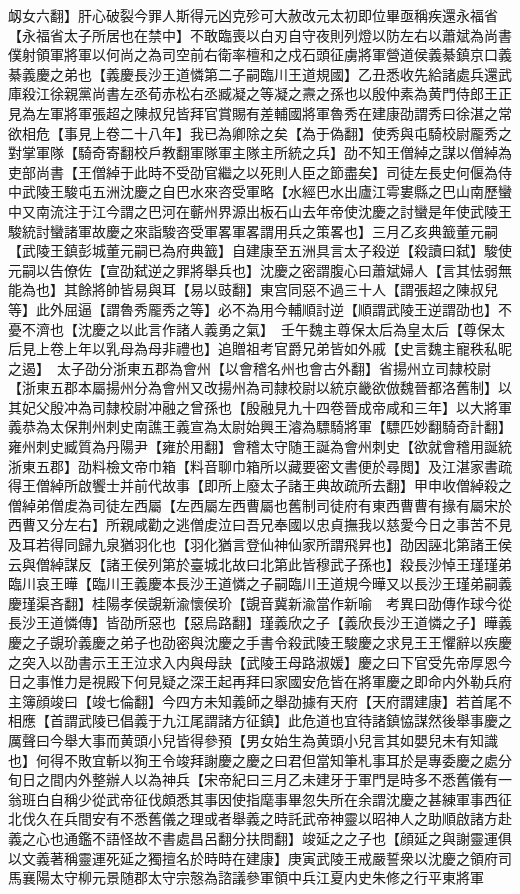 衂女六翻】肝心破裂今罪人斯得元凶克殄可大赦改元太初即位畢亟稱疾還永福省【永福省太子所居也在禁中】不敢臨喪以白刃自守夜則列燈以防左右以蕭斌為尚書僕射領軍將軍以何尚之為司空前右衛率檀和之戍石頭征虜將軍營道侯義綦鎮京口義綦義慶之弟也【義慶長沙王道憐第二子嗣臨川王道規國】乙丑悉收先給諸處兵還武庫殺江徐親黨尚書左丞荀赤松右丞臧凝之等凝之燾之孫也以殷仲素為黄門侍郎王正見為左軍將軍張超之陳叔兒皆拜官賞賜有差輔國將軍魯秀在建康劭謂秀曰徐湛之常欲相危【事見上卷二十八年】我已為卿除之矣【為于偽翻】使秀與屯騎校尉龎秀之對掌軍隊【騎奇寄翻校戶教翻軍隊軍主隊主所統之兵】劭不知王僧綽之謀以僧綽為吏部尚書【王僧綽于此時不受劭官繼之以死則人臣之節盡矣】司徒左長史何偃為侍中武陵王駿屯五洲沈慶之自巴水來咨受軍略【水經巴水出廬江雩婁縣之巴山南歷蠻中又南流注于江今謂之巴河在蘄州界源出板石山去年帝使沈慶之討蠻是年使武陵王駿統討蠻諸軍故慶之來詣駿咨受軍畧軍畧謂用兵之策畧也】三月乙亥典籖董元嗣【武陵王鎮彭城董元嗣已為府典籖】自建康至五洲具言太子殺逆【殺讀曰弑】駿使元嗣以告僚佐【宣劭弑逆之罪將舉兵也】沈慶之密謂腹心曰蕭斌婦人【言其怯弱無能為也】其餘將帥皆易與耳【易以豉翻】東宫同惡不過三十人【謂張超之陳叔兒等】此外屈逼【謂魯秀龎秀之等】必不為用今輔順討逆【順謂武陵王逆謂劭也】不憂不濟也【沈慶之以此言作諸人義勇之氣】　壬午魏主尊保太后為皇太后【尊保太后見上卷上年以乳母為母非禮也】追贈祖考官爵兄弟皆如外戚【史言魏主寵秩私昵之遏】　太子劭分浙東五郡為會州【以會稽名州也會古外翻】省揚州立司隸校尉【浙東五郡本屬揚州分為會州又改揚州為司隸校尉以統京畿欲倣魏晉都洛舊制】以其妃父殷冲為司隸校尉冲融之曾孫也【殷融見九十四卷晉成帝咸和三年】以大將軍義恭為太保荆州刺史南譙王義宣為太尉始興王濬為驃騎將軍【驃匹妙翻騎奇計翻】雍州刺史臧質為丹陽尹【雍於用翻】會稽太守随王誕為會州刺史【欲就會稽用誕統浙東五郡】劭料檢文帝巾箱【料音聊巾箱所以藏要密文書便於尋閲】及江湛家書疏得王僧綽所啟饗士并前代故事【即所上廢太子諸王典故疏所去翻】甲申收僧綽殺之僧綽弟僧䖍為司徒左西屬【左西屬左西曹屬也舊制司徒府有東西曹曹有掾有屬宋於西曹又分左右】所親咸勸之逃僧䖍泣曰吾兄奉國以忠貞撫我以慈愛今日之事苦不見及耳若得同歸九泉猶羽化也【羽化猶言登仙神仙家所謂飛昇也】劭因誣北第諸王侯云與僧綽謀反【諸王侯列第於臺城北故曰北第此皆穆武子孫也】殺長沙悼王瑾瑾弟臨川哀王曄【臨川王義慶本長沙王道憐之子嗣臨川王道規今曄又以長沙王瑾弟嗣義慶瑾渠吝翻】桂陽孝侯覬新渝懷侯玠【覬音冀新渝當作新喻　考異曰劭傳作球今從長沙王道憐傳】皆劭所惡也【惡烏路翻】瑾義欣之子【義欣長沙王道憐之子】曄義慶之子覬玠義慶之弟子也劭密與沈慶之手書令殺武陵王駿慶之求見王王懼辭以疾慶之突入以劭書示王王泣求入内與母訣【武陵王母路淑媛】慶之曰下官受先帝厚恩今日之事惟力是視殿下何見疑之深王起再拜曰家國安危皆在將軍慶之即命内外勒兵府主簿顔竣曰【竣七倫翻】今四方未知義師之舉劭據有天府【天府謂建康】若首尾不相應【首謂武陵已倡義于九江尾謂諸方征鎮】此危道也宜待諸鎮恊謀然後舉事慶之厲聲曰今舉大事而黄頭小兒皆得參預【男女始生為黄頭小兒言其如嬰兒未有知識也】何得不敗宜斬以狥王令竣拜謝慶之慶之曰君但當知筆札事耳於是專委慶之處分旬日之間内外整辦人以為神兵【宋帝紀曰三月乙未建牙于軍門是時多不悉舊儀有一翁班白自稱少從武帝征伐頗悉其事因使指麾事畢忽失所在余謂沈慶之甚練軍事西征北伐久在兵間安有不悉舊儀之理或者舉義之時託武帝神靈以昭神人之助順啟諸方赴義之心也通鑑不語怪故不書處昌呂翻分扶問翻】竣延之之子也【顔延之與謝靈運俱以文義著稱靈運死延之獨擅名於時時在建康】庚寅武陵王戒嚴誓衆以沈慶之領府司馬襄陽太守柳元景随郡太守宗慤為諮議參軍領中兵江夏内史朱修之行平東將軍